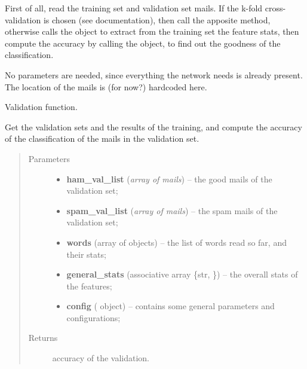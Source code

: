 \documentclass[letterpaper,10pt,english]{sphinxmanual}
\begin{document}
\begin{fulllineitems}
\begin{fulllineitems}
First of all, read the training set and validation set mails.
If the k-fold cross-validation is chosen (see {\hyperref[index:config.Config]{}}
documentation), then call the apposite method, otherwise calls the
{\hyperref[index:trainer.Trainer]{}} object to extract from the training set
the feature stats, then compute the accuracy by calling the
{\hyperref[index:naive_bayes.Bayes.validate]{}} object, to find out the goodness of
the classification.

No parameters are needed, since everything the network needs is already
present. The location of the mails is (for now?) hardcoded here.

\end{fulllineitems}


\begin{fulllineitems}
\label{index:naive_bayes.Bayes.validate}
Validation function.

Get the validation sets and the results of the training, and
compute the accuracy of the classification of the mails
in the validation set.
\begin{quote}\begin{description}
\item[{Parameters}] \leavevmode\begin{itemize}
\item {} 
\textbf{ham\_val\_list} (\emph{array of mails}) -- the good mails of the validation set;

\item {} 
\textbf{spam\_val\_list} (\emph{array of mails}) -- the spam mails of the validation set;

\item {} 
\textbf{words} (array of {\hyperref[index:gen_stat.Word]{}} objects) -- the list of words read so far, and their stats;

\item {} 
\textbf{general\_stats} (associative array \{str, {\hyperref[index:gen_stat.Stat]{}}\}) -- the overall stats of the features;

\item {} 
\textbf{config} ({\hyperref[index:config.Config]{}} object) -- contains some general parameters and configurations;

\end{itemize}

\item[{Returns}] \leavevmode
accuracy of the validation.

\end{description}\end{quote}

\end{fulllineitems}


\end{fulllineitems}
\end{document}
